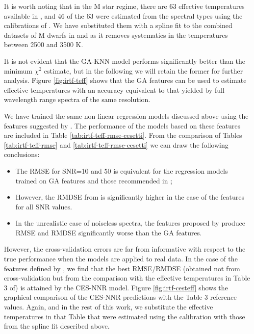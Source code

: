 It is worth noting that in the M star regime, there are 63 effective
temperatures available in \cite{cesetti}, and 46 of the 63 were
estimated from the spectral types using the calibrations
of \cite{1996imsa.book.....O}. We have substituted them with a spline
fit to the combined datasets of M dwarfs in \cite{2013A&A...556A..15R}
and \cite{2012ApJ...757..112B} as it removes systematics in the
temperatures between 2500 and 3500 K.

It is not evident that the GA-KNN model performs significantly better
than the minimum $\chi^2$ estimate, but in the following we will
retain the former for further analysis. Figure \ref{fig:irtf-teff}
shows that the GA features can be used to estimate effective
temperatures with an accuracy equivalent to that yielded by full
wavelength range spectra of the same resolution.



We have trained the same non linear regression models discussed above
using the features suggested by \cite{cesetti}. The performance of the
models based on these features are included in Table
\ref{tab:irtf-teff-rmse-cesetti}. From the comparison of Tables
\ref{tab:irtf-teff-rmse} and
\ref{tab:irtf-teff-rmse-cesetti} we can draw the following conclusions:

\begin{itemize}

\item The RMSE for SNR=10 and 50 is equivalent for the regression
  models trained on GA features and those recommended
  in \cite{cesetti};

\item However, the RMDSE from \cite{cesetti} is significantly higher
  in the case of the features for all SNR values.

\item In the unrealistic case of noiseless spectra, the features proposed
  by \cite{cesetti} produce RMSE and RMDSE significantly worse than
  the GA features.

\end{itemize}

However, the cross-validation errors are far from informative with
respect to the true performance when the models are applied to real
data. In the case of the features defined by \cite{cesetti}, we find
that the best RMSE/RMDSE (obtained not from cross-validation but from
the comparison with the effective temperatures in Table 3
of\cite{cesetti}) is attained by the CES-NNR
model. Figure \ref{fig:irtf-cesteff} shows the graphical comparison of
the CES-NNR predictions with the Table 3 reference values. Again, and
in the rest of this work, we substitute the effective temperatures in
that Table that were estimated using the \cite{1996imsa.book.....O}
calibration with those from the spline fit described above.

